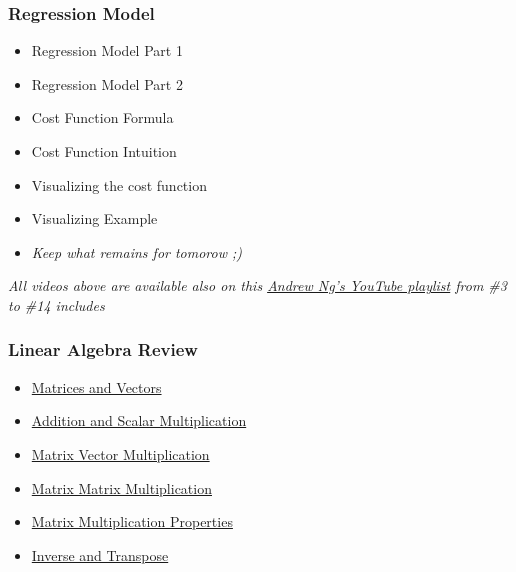 \subsubsection*{Regression Model}  
\begin{itemize}
  \item Regression Model Part 1
  \item Regression Model Part 2
  \item Cost Function Formula
  \item Cost Function Intuition
  \item Visualizing the cost function
  \item Visualizing Example
  \item \textit{Keep what remains for tomorow ;)}
\end{itemize}

\emph{All videos above are available also on this \href{https://youtube.com/playlist?list=PLkDaE6sCZn6FNC6YRfRQc_FbeQrF8BwGI&feature=shared}{Andrew Ng's YouTube playlist} from \#3 to \#14 includes}

\newpage

\subsubsection*{Linear Algebra Review}
\begin{itemize}
  \item \href{https://www.youtube.com/watch?v=XMB__E658fQ}{Matrices and Vectors}
  \item \href{https://www.youtube.com/watch?v=k1JGJhUGmBE}{Addition and Scalar Multiplication}
  \item \href{https://www.youtube.com/watch?v=VIfykceJoZI}{Matrix Vector Multiplication}
  \item \href{https://www.youtube.com/watch?v=JHZKyt0m1kc}{Matrix Matrix Multiplication}
  \item \href{https://www.youtube.com/watch?v=wqM7O_ZUtCc}{Matrix Multiplication Properties}
  \item \href{https://www.youtube.com/watch?v=IUf8HDyUeY0}{Inverse and Transpose}
\end{itemize}
